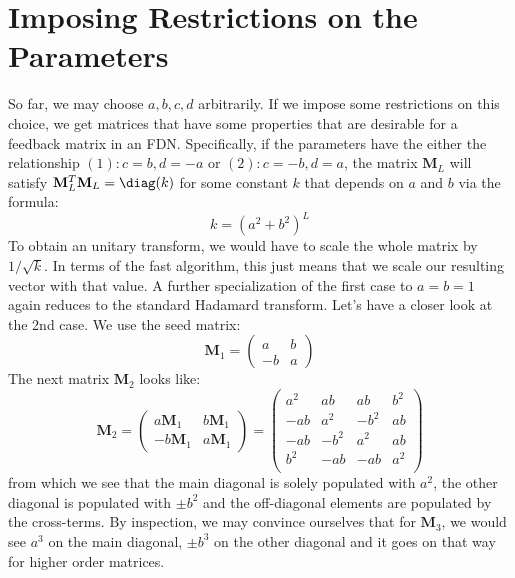 \section{Imposing Restrictions on the Parameters}
So far, we may choose $a, b, c, d$ arbitrarily. If we impose some restrictions on this choice, we get matrices that have some properties that are desirable for a feedback matrix in an FDN. Specifically, if the parameters have the either the relationship $(1): c=b, d=-a$ or $(2): c=-b, d=a$, the matrix $\mathbf{M}_L$ will satisfy $\mathbf{M}_L^T \mathbf{M}_L = \diag(k)$ for some constant $k$ that depends on $a$ and $b$ via the formula:
\begin{equation}
 \boxed
 {
  k = (a^2+b^2)^L
 }
\end{equation}
To obtain an unitary transform, we would have to scale the whole matrix by $1 / \sqrt{k}$. In terms of the fast algorithm, this just means that we scale our resulting vector with that value. A further specialization of the first case to $a=b=1$ again reduces to the standard Hadamard transform. Let's have a closer look at the 2nd case. We use the seed matrix:
\begin{equation}
 \mathbf{M}_1 =
 \begin{pmatrix}
 a  & b  \\
 -b & a
 \end{pmatrix}
\end{equation}
The next matrix $\mathbf{M}_2$ looks like:
\begin{equation}
 \label{Eq:MatrixM2}
 \mathbf{M}_{2}
 =
 \begin{pmatrix}
 a  \mathbf{M}_1 &  b \mathbf{M}_1  \\
 -b \mathbf{M}_1 &  a \mathbf{M}_1
 \end{pmatrix}
 =
 \begin{pmatrix}
 a^2 & ab   & ab   & b^2  \\
 -ab & a^2  & -b^2 & ab   \\
 -ab & -b^2 & a^2  & ab   \\ 
 b^2 & -ab  & -ab  & a^2  \\ 
 \end{pmatrix} 
\end{equation}
from which we see that the main diagonal is solely populated with $a^2$, the other diagonal is populated with $\pm b^2$ and the off-diagonal elements are populated by the cross-terms. By inspection, we may convince ourselves that for $\mathbf{M}_3$, we would see $a^3$ on the main diagonal, $\pm b^3$ on the other diagonal and it goes on that way for higher order matrices.

